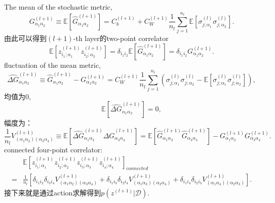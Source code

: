 The mean of the stochastic metric,
\begin{equation}
    G_{\alpha_1\alpha_2}^{(l+1)} \equiv \mathbb{E}\left[\hat{G}_{\alpha_1\alpha_2}^{(l+1)}
    \right] = C_b^{(l+1)} + C_W^{(l+1)}\frac{1}{n_l}\sum_{j=1}^{n_l}\mathbb{E}\left[
        \sigma_{j;\alpha_1}^{(l)}\sigma_{j;\alpha_2}^{(l)} \right].
\end{equation}
由此可以得到$(l+1)$-th layer的two-point correlator
\begin{equation}
    \mathbb{E}\left[z_{i_1;\alpha_1}^{(l+1)}z_{i_2;\alpha_2}^{(l+1)}\right]
    =\delta_{i_1i_2}\mathbb{E}\left[\hat{G}_{\alpha_1\alpha_2}^{(l+1)}\right]
    =\delta_{i_1i_2}G_{\alpha_1\alpha_2}^{(l+1)}.
    \label{eq:ch4_2point_corr_layer_lp1}
\end{equation}
fluctuation of the mean metric,
\begin{equation}
    \hat{\Delta G}_{\alpha_1\alpha_2}^{(l+1)} \equiv \hat{G}_{\alpha_1\alpha_2}^{(l+1)}
    - G_{\alpha_1\alpha_2}^{(l+1)} = C_W^{(l+1)}\frac{1}{n_l}\sum_{j=1}^{n_l}
    \left(\sigma_{j;\alpha_1}^{(l)}\sigma_{j;\alpha_2}^{(l)}-\mathbb{E}
    \left[\sigma_{j;\alpha_1}^{(l)}\sigma_{j;\alpha_2}^{(l)}\right] \right),
\end{equation}
均值为$0$,
\begin{equation}
    \mathbb{E}\left[\hat{\Delta G}_{\alpha_1\alpha_2}^{(l+1)}\right] = 0,
\end{equation}
幅度为：
\begin{equation}
    \frac{1}{n_l}V_{(\alpha_1\alpha_2)(\alpha_3\alpha_4)}^{(l+1)} \equiv
    \mathbb{E}\left[\hat{\Delta G}_{\alpha_1\alpha_2}^{(l+1)}
    \hat{\Delta G}_{\alpha_3\alpha_4}^{(l+1)}\right] = \mathbb{E}\left[
    \hat{G}_{\alpha_1\alpha_2}^{(l+1)}\hat{G}_{\alpha_3\alpha_4}^{(l+1)} \right]
    -G_{\alpha_1\alpha_2}^{(l+1)}G_{\alpha_3\alpha_4}^{(l+1)}.
\end{equation}
connected four-point correlator:
\begin{equation}
    \begin{aligned}
    & \mathbb{E}\left[z_{i_1;\alpha_1}^{(l+1)}z_{i_2;\alpha_2}^{(l+1)}
        z_{i_3;\alpha_3}^{(l+1)}z_{i_4;\alpha_4}^{(l+1)} \right]_{connected} \\
    =& \frac{1}{n_l}\left[\delta_{i_1i_2}\delta_{i_3i_4}V_{(\alpha_1\alpha_2)
    (\alpha_3\alpha_4)}^{(l+1)} + \delta_{i_1i_3}\delta_{i_2i_4}V_{(\alpha_1\alpha_3)
    (\alpha_2\alpha_4)}^{(l+1)} + \delta_{i_1i_4}\delta_{i_2i_3}V_{(\alpha_1\alpha_4)
    (\alpha_2\alpha_3)}^{(l+1)} \right].
    \end{aligned}
    \label{eq:ch4_conn_4point_corr_layer_l}
\end{equation}
接下来就是通过action求解得到$p\left(z^{(l+1)}\big| \mathcal{D}\right)$.

